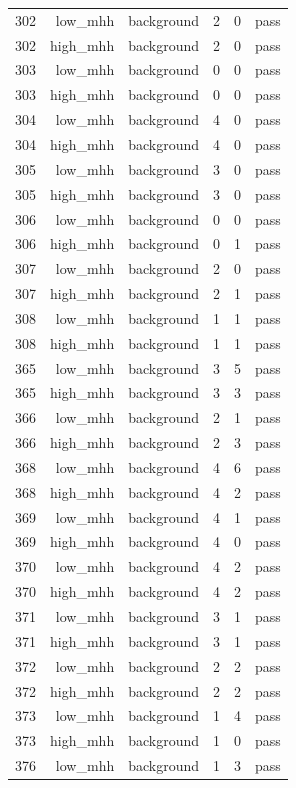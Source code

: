 \begin{table}[htbp]
{\begin{tabular}{lrrrrr}
302 & low\_mhh & background & 2 & 0 & pass \\
302 & high\_mhh & background & 2 & 0 & pass \\
303 & low\_mhh & background & 0 & 0 & pass \\
303 & high\_mhh & background & 0 & 0 & pass \\
304 & low\_mhh & background & 4 & 0 & pass \\
304 & high\_mhh & background & 4 & 0 & pass \\
305 & low\_mhh & background & 3 & 0 & pass \\
305 & high\_mhh & background & 3 & 0 & pass \\
306 & low\_mhh & background & 0 & 0 & pass \\
306 & high\_mhh & background & 0 & 1 & pass \\
307 & low\_mhh & background & 2 & 0 & pass \\
307 & high\_mhh & background & 2 & 1 & pass \\
308 & low\_mhh & background & 1 & 1 & pass \\
308 & high\_mhh & background & 1 & 1 & pass \\
365 & low\_mhh & background & 3 & 5 & pass \\
365 & high\_mhh & background & 3 & 3 & pass \\
366 & low\_mhh & background & 2 & 1 & pass \\
366 & high\_mhh & background & 2 & 3 & pass \\
368 & low\_mhh & background & 4 & 6 & pass \\
368 & high\_mhh & background & 4 & 2 & pass \\
369 & low\_mhh & background & 4 & 1 & pass \\
369 & high\_mhh & background & 4 & 0 & pass \\
370 & low\_mhh & background & 4 & 2 & pass \\
370 & high\_mhh & background & 4 & 2 & pass \\
371 & low\_mhh & background & 3 & 1 & pass \\
371 & high\_mhh & background & 3 & 1 & pass \\
372 & low\_mhh & background & 2 & 2 & pass \\
372 & high\_mhh & background & 2 & 2 & pass \\
373 & low\_mhh & background & 1 & 4 & pass \\
373 & high\_mhh & background & 1 & 0 & pass \\
376 & low\_mhh & background & 1 & 3 & pass \\

\end{tabular}}
\end{table}
